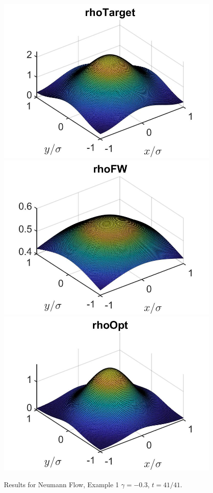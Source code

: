 \documentclass[11pt, a4paper]{article}
\theoremstyle{definition}
\begin{document}
\begin{figure}[h]
	\includegraphics[scale=0.3]{rhoHat2DN2b.jpg}
	\includegraphics[scale=0.3]{rhoFW2DN2b.jpg}
	\includegraphics[scale=0.3]{rhoOpt2DN2b.jpg}
	\caption{Results for Neumann Flow, Example 1 $\gamma = -0.3$, $t = 41/41$.}
	\label{Ex12DN2b}
\end{figure}
\end{document}
